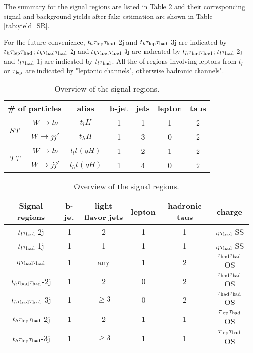 The summary for the signal regions are listed in Table \ref{tab:signalregions} and their corresponding signal and background yields after fake estimation are shown
in Table \ref{tab:yield_SR}.

For the future convenience, $t_h\tau_\text{lep}{}\tau_\text{had}$-2j and $t_h\tau_\text{lep}{}\tau_\text{had}$-3j are indicated by $t_h\tau_\text{lep}{}\tau_\text{had}$; $t_h\tau_\text{had}{}\tau_\text{had}$-2j and $t_h\tau_\text{had}{}\tau_\text{had}$-3j are indicated by $t_h\tau_\text{had}{}\tau_\text{had}$; $t_l\tau_\text{had}$-2j and $t_l\tau_\text{had}$-1j are indicated by $t_l\tau_\text{had}$. All the of regions involving leptons from $t_l$ or $\tau_\text{lep}$ are indicated by "leptonic channels", otherwise hadronic channels".

\begin{table}
\footnotesize
\centering
\caption{Overview of the final states of signal events.}
\label{tab:signalevents}
\begin{tabular}[h]{c|c|c|c|c|c|c}
\hline \hline

\multicolumn{2}{c|}{\# of particles}	& alias & b-jet & jets & lepton & taus\\ \hline
\multirow{2}{*}{\textit{ST}}	& $W\to l\nu$		& $t_lH$   & 1	    & 1    & 1      & 2   \\ \cline{2-7}
					& $W\to jj'$	& $t_hH$   & 1	    & 3    & 0      & 2   \\ \hline
\multirow{2}{*}{\textit{TT}}	& $W\to l\nu$		& $t_lt(qH)$   & 1	    & 2    & 1      & 2   \\ \cline{2-7}
					& $W\to jj'$	& $t_ht(qH)$   & 1	    & 4    & 0      & 2   \\ \hline
\end{tabular}
\footnotesize
\centering
\caption{Overview of the signal regions.}
\label{tab:signalregions}
\begin{tabular}[h]{c|c|c|c|c|c}
\hline \hline
Signal regions & b-jet & light flavor jets	& lepton & hadronic taus & charge\\ \hline
$t_l\tau_\text{had}$-2j  & 1     & 2					& 1      & 1			 & $t_l\tau_\text{had}$ SS\\ \hline
$t_l\tau_\text{had}$-1j  & 1     & 1					& 1      & 1			 & $t_l\tau_\text{had}$ SS\\ \hline
$t_l\tau_\text{had}{}\tau_\text{had}$	   & 1     & any				& 1      & 2             & $\tau_\text{had}{}\tau_\text{had}$ OS\\ \hline
$t_h\tau_\text{had}{}\tau_\text{had}$-2j & 1     & 2      			& 0      & 2             & $\tau_\text{had}{}\tau_\text{had}$ OS\\ \hline
$t_h\tau_\text{had}{}\tau_\text{had}$-3j & 1     & $\ge3$ 			& 0      & 2             & $\tau_\text{had}{}\tau_\text{had}$ OS\\ \hline
$t_h\tau_\text{lep}{}\tau_\text{had}$-2j   & 1     & 2      			& 1      & 1             & $\tau_\text{lep}{}\tau_\text{had}$ OS\\ \hline
$t_h\tau_\text{lep}{}\tau_\text{had}$-3j   & 1     & $\ge3$ 			& 1      & 1             & $\tau_\text{lep}{}\tau_\text{had}$ OS\\ \hline
\end{tabular}
\end{table}

